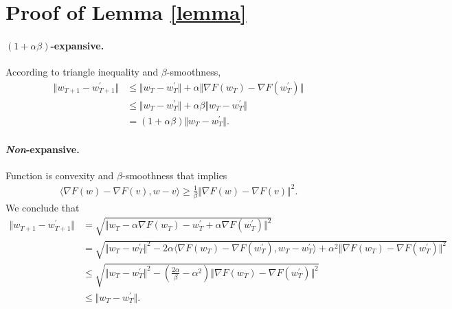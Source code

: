 \section{Proof of Lemma \ref{lemma}}\label{pro-lemma}  \paragraph{\boldmath$(1+\alpha\beta)$-expansive.} According to triangle inequality and $\beta$-smoothness,
\begin{equation}\label{eq:app2.1}
     \begin{aligned}
      \Vert w_{T+1} - w_{T+1}^{\prime}\Vert &\leq \Vert w_T- w_T^{\prime}\Vert + \alpha\Vert \nabla F(w_T) -\nabla F(w_T^{\prime})\Vert \\
      &\leq \Vert w_T- w_T^{\prime}\Vert + \alpha\beta \Vert w_T- w_T^{\prime}\Vert \\
      &= (1+\alpha\beta)\Vert w_T- w_T^{\prime}\Vert .
     \end{aligned}
\end{equation}

\paragraph{\emph{Non}-expansive.} Function is convexity and $\beta$-smoothness that implies 
\begin{equation}\label{eq:app2.2}
     \begin{aligned}
      \langle \nabla F(w) -\nabla F(v), w - v \rangle \geq \frac{1}{\beta} \Vert \nabla F(w) -\nabla F(v)\Vert^2 .
     \end{aligned}
\end{equation}
We conclude that
\begin{equation}\label{eq:app2.3}
     \begin{aligned}
      \Vert w_{T+1} - w_{T+1}^{\prime}\Vert &= \sqrt{\Vert w_{T} - \alpha \nabla F(w_{T}) - w_{T}^{\prime} + \alpha \nabla F(w_{T}^{\prime})\Vert^2}  \\
      &=\sqrt{\Vert w_{T} - w_{T}^{\prime} \Vert^2 - 2\alpha\langle \nabla F(w_{T}) -\nabla F(w_{T}^{\prime}), w_T- w_T^{\prime} \rangle +\alpha^2 \Vert \nabla F(w_{T}) - \nabla F(w_{T}^{\prime})\Vert^2} \\
      &\leq \sqrt{\Vert w_T- w_T^{\prime}\Vert^2 - \left(\frac{2\alpha}{\beta} -\alpha^2 \right) \Vert \nabla F(w_{T}) -\nabla F(w_{T}^{\prime})\Vert^2} \\
      &\leq \Vert w_T- w_T^{\prime}\Vert.
     \end{aligned}
\end{equation}

